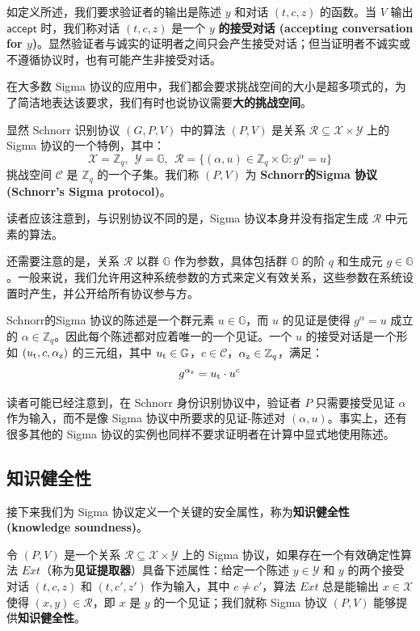 如定义所述，我们要求验证者的输出是陈述 $y$ 和对话 $(t,c,z)$ 的函数。当 $V$ 输出 $\mathsf{accept}$ 时，我们称对话 $(t,c,z)$ 是一个 $y$ \textbf{的接受对话 (accepting conversation for $y$)}。显然验证者与诚实的证明者之间只会产生接受对话；但当证明者不诚实或不遵循协议时，也有可能产生非接受对话。

在大多数 Sigma 协议的应用中，我们都会要求挑战空间的大小是超多项式的，为了简洁地表达该要求，我们有时也说协议需要\textbf{大的挑战空间}。

\begin{example}\label{exmp:19-1}
显然 Schnorr 识别协议 $(G,P,V)$ 中的算法 $(P,V)$ 是关系 $\mathcal{R}\subseteq\mathcal{X}×\mathcal{Y}$ 上的 Sigma 协议的一个特例，其中：
$$
\mathcal{X}=\mathbb{Z}_q,~~
\mathcal{Y}=\mathbb{G},~~
\mathcal{R}=\{(\alpha,u)\in\mathbb{Z}_q\times\mathbb{G}:g^\alpha=u\}
$$
挑战空间 $\mathcal{C}$ 是 $\mathbb{Z}_q$ 的一个子集。我们称 $(P,V)$ 为 \textbf{Schnorr的Sigma 协议 (Schnorr's Sigma protocol)}。

读者应该注意到，与识别协议不同的是，Sigma 协议本身并没有指定生成 $\mathcal{R}$ 中元素的算法。

还需要注意的是，关系 $\mathcal{R}$ 以群 $\mathbb{G}$ 作为参数，具体包括群 $\mathbb{G}$ 的阶 $q$ 和生成元 $g\in\mathbb{G}$。一般来说，我们允许用这种系统参数的方式来定义有效关系，这些参数在系统设置时产生，并公开给所有协议参与方。

Schnorr的Sigma 协议的陈述是一个群元素 $u\in\mathbb{G}$，而 $u$ 的见证是使得 $g^\alpha=u$ 成立的 $\alpha\in\mathbb{Z}_q$。因此每个陈述都对应着唯一的一个见证。一个 $u$ 的接受对话是一个形如 $(u_{\rm t},c,\alpha_{\rm z})$ 的三元组，其中 $u_{\rm t}\in\mathbb{G}$，$c\in\mathcal{C}$，$\alpha_{\rm z}\in\mathbb{Z}_q$，满足：
$$
g^{\alpha_{\rm z}}=u_{\rm t}\cdot u^c
$$

读者可能已经注意到，在 Schnorr 身份识别协议中，验证者 $P$ 只需要接受见证 $\alpha$ 作为输入，而不是像 Sigma 协议中所要求的见证-陈述对 $(\alpha,u)$。事实上，还有很多其他的 Sigma 协议的实例也同样不要求证明者在计算中显式地使用陈述。
\end{example}

\subsection{知识健全性}

接下来我们为 Sigma 协议定义一个关键的安全属性，称为\textbf{知识健全性 (knowledge soundness)}。

\begin{definition}[知识健全性]
令 $(P,V)$ 是一个关系 $\mathcal{R}\subseteq\mathcal{X}×\mathcal{Y}$ 上的 Sigma 协议，如果存在一个有效确定性算法 ${Ext}$（称为\textbf{见证提取器}）具备下述属性：给定一个陈述 $y\in\mathcal{Y}$ 和 $y$ 的两个接受对话 $(t,c,z)$ 和 $(t,c',z')$ 作为输入，其中 $c\neq c'$，算法 ${Ext}$ 总是能输出 $x\in\mathcal{X}$ 使得 $(x,y)\in\mathcal{R}$，即 $x$ 是 $y$ 的一个见证；我们就称 Sigma 协议 $(P,V)$ 能够提供\textbf{知识健全性}。
\end{definition}

